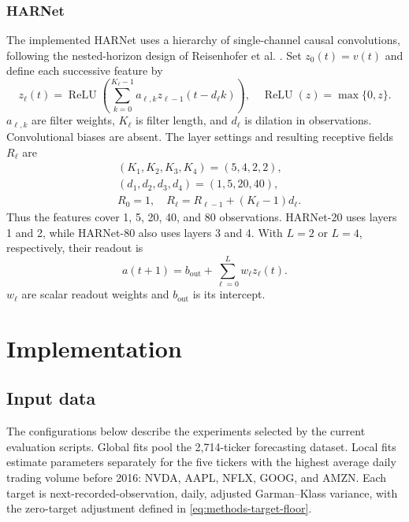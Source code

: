 \documentclass[12pt,a4paper]{article}
\numberwithin{equation}{section}
\numberwithin{table}{section}
\numberwithin{figure}{section}
\begin{document}
\subsubsection{HARNet}
The implemented HARNet uses a hierarchy of single-channel causal convolutions, following the nested-horizon design of Reisenhofer et al. \cite{reisenhofer2022}. Set $z_0(t)=v(t)$ and define each successive feature by
\begin{equation}\label{eq:methods-harnet-convolution}
z_\ell(t)=\operatorname{ReLU}\!\left(\sum_{k=0}^{K_\ell-1}
a_{\ell,k}z_{\ell-1}(t-d_\ell k)\right),\quad
\operatorname{ReLU}(z)=\max\{0,z\}.
\end{equation}
$a_{\ell,k}$ are filter weights, $K_\ell$ is filter length, and $d_\ell$ is dilation in observations. Convolutional biases are absent. The layer settings and resulting receptive fields $R_\ell$ are
\begin{equation}\label{eq:methods-harnet-horizons}
\begin{aligned}
&(K_1,K_2,K_3,K_4)=(5,4,2,2),\\
&(d_1,d_2,d_3,d_4)=(1,5,20,40),\\
&R_0=1,\quad R_\ell=R_{\ell-1}+(K_\ell-1)d_\ell.
\end{aligned}
\end{equation}
Thus the features cover 1, 5, 20, 40, and 80 observations. HARNet-20 uses layers 1 and 2, while HARNet-80 also uses layers 3 and 4. With $L=2$ or $L=4$, respectively, their readout is
\begin{equation}\label{eq:methods-harnet-readout}
a(t+1)=b_{\mathrm{out}}+\sum_{\ell=0}^{L}w_\ell z_\ell(t).
\end{equation}
$w_\ell$ are scalar readout weights and $b_{\mathrm{out}}$ is its intercept. 

\section{Implementation}
\subsection{Input data}
The configurations below describe the experiments selected by the current evaluation scripts. Global fits pool the 2,714-ticker forecasting dataset. Local fits estimate parameters separately for the five tickers with the highest average daily trading volume before 2016: NVDA, AAPL, NFLX, GOOG, and AMZN. Each target is next-recorded-observation, daily, adjusted Garman--Klass variance, with the zero-target adjustment defined in \eqref{eq:methods-target-floor}.
\end{document}

